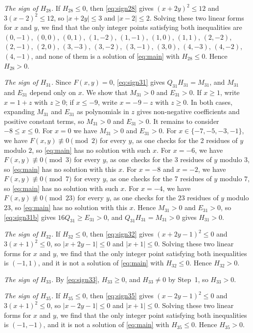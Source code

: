 \documentclass[11pt]{article}
\begin{document}
\emph{The sign of $H_{28}$.} If $H_{28}\leq0$, then \eqref{eq:sign28} gives $(x+2y)^2\leq 12$ and $3(x-2)^2\leq 12$, so $|x+2y|\leq3$ and $|x-2|\leq2$. Solving these two linear forms for $x$ and $y$, we find that the only integer points satisfying both inequalities are $(0,-1)$, $(0,0)$, $(0,1)$, $(1,-2)$, $(1,-1)$, $(1,0)$, $(1,1)$, $(2,-2)$, $(2,-1)$, $(2,0)$, $(3,-3)$, $(3,-2)$, $(3,-1)$, $(3,0)$, $(4,-3)$, $(4,-2)$, $(4,-1)$, and none of them is a solution of \eqref{eq:main} with $H_{28}\leq0$. Hence $H_{28}>0$.

\emph{The sign of $H_{31}$.} Since $F(x,y)=0$, \eqref{eq:sign31} gives $Q_{31}H_{31}=M_{31}$, and $M_{31}$ and $E_{31}$ depend only on $x$. We show that $M_{31}>0$ and $E_{31}>0$. If $x\geq1$, write $x=1+z$ with $z\geq0$; if $x\leq-9$, write $x=-9-z$ with $z\geq0$. In both cases, expanding $M_{31}$ and $E_{31}$ as polynomials in $z$ gives non-negative coefficients and positive constant terms, so $M_{31}>0$ and $E_{31}>0$. It remains to consider $-8\leq x\leq0$. For $x=0$ we have $M_{31}>0$ and $E_{31}>0$. For $x\in\{-7,\allowbreak -5,\allowbreak -3,\allowbreak -1\}$, we have $F(x,y)\not\equiv0\pmod{2}$ for every $y$, as one checks for the 2 residues of $y$ modulo $2$, so \eqref{eq:main} has no solution with such $x$. For $x=-6$, we have $F(x,y)\not\equiv0\pmod{3}$ for every $y$, as one checks for the 3 residues of $y$ modulo $3$, so \eqref{eq:main} has no solution with this $x$. For $x=-8$ and $x=-2$, we have $F(x,y)\not\equiv0\pmod{7}$ for every $y$, as one checks for the 7 residues of $y$ modulo $7$, so \eqref{eq:main} has no solution with such $x$. For $x=-4$, we have $F(x,y)\not\equiv0\pmod{23}$ for every $y$, as one checks for the 23 residues of $y$ modulo $23$, so \eqref{eq:main} has no solution with this $x$. Hence $M_{31}>0$ and $E_{31}>0$, so \eqref{eq:sign31b} gives $16Q_{31}\geq E_{31}>0$, and $Q_{31}H_{31}=M_{31}>0$ gives $H_{31}>0$.

\emph{The sign of $H_{32}$.} If $H_{32}\leq0$, then \eqref{eq:sign32} gives $(x+2y-1)^2\leq 0$ and $3(x+1)^2\leq 0$, so $|x+2y-1|\leq0$ and $|x+1|\leq0$. Solving these two linear forms for $x$ and $y$, we find that the only integer point satisfying both inequalities is $(-1,1)$, and it is not a solution of \eqref{eq:main} with $H_{32}\leq0$. Hence $H_{32}>0$.

\emph{The sign of $H_{33}$.} By \eqref{eq:sign33}, $H_{33}\geq0$, and $H_{33}\neq0$ by Step~1, so $H_{33}>0$.

\emph{The sign of $H_{35}$.} If $H_{35}\leq0$, then \eqref{eq:sign35} gives $(x-2y-1)^2\leq 0$ and $3(x+1)^2\leq 0$, so $|x-2y-1|\leq0$ and $|x+1|\leq0$. Solving these two linear forms for $x$ and $y$, we find that the only integer point satisfying both inequalities is $(-1,-1)$, and it is not a solution of \eqref{eq:main} with $H_{35}\leq0$. Hence $H_{35}>0$.
\end{document}
